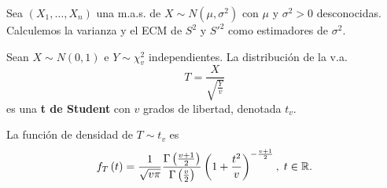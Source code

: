 \begin{eg}
Sea $\displaystyle \left(X_{1}, \ldots, X_{n}\right) $ una m.a.s. de $\displaystyle X \sim N\left(\mu, \sigma^{2}\right) $ con $\displaystyle \mu $ y $\displaystyle \sigma^{2} > 0 $ desconocidas. Calculemos la varianza y el ECM de $\displaystyle S^{2} $ y $\displaystyle S'^{2} $ como estimadores de $\displaystyle \sigma^{2} $. 
\end{eg}
\begin{definition}
Sean $\displaystyle X\sim N\left(0,1\right) $ e $\displaystyle Y \sim \chi^{2}_{v} $ independientes. La distribución de la v.a.
\[T = \frac{X}{\sqrt{\frac{Y}{v}}} \]
es una \textbf{t de Student} con $\displaystyle v $ grados de libertad, denotada $\displaystyle t_{v} $. 
\end{definition}
\begin{prop}
La función de densidad de $\displaystyle T\sim t_{v} $ es
\[f_{T}\left(t\right)=\frac{1}{\sqrt{v\pi }}\frac{\Gamma\left(\frac{v+1}{2}\right)}{\Gamma\left(\frac{v}{2}\right)}\left(1 + \frac{t ^{2}}{v}\right)^{-\frac{v+1}{2}}, \; t \in \mathbb{R} .\]
\end{prop}

